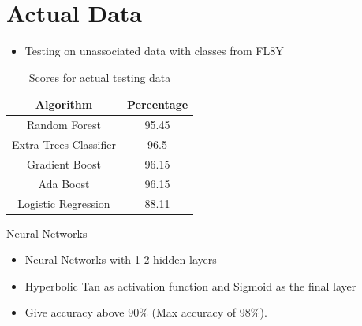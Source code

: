 \documentclass{beamer}
\begin{document}
\section{Actual Data}
\begin{frame}
\begin{itemize}
\item Testing on unassociated data with classes from FL8Y
\end{itemize}
\begin{table}[!h]
    \centering
    
    \begin{tabular}{|c|c|}
    \hline
    Algorithm&Percentage\\
     \hline
    Random Forest & 95.45\\
    \hline %
    Extra Trees Classifier& 96.5 \\
    \hline
    Gradient Boost & 96.15\\
    \hline %
    Ada Boost& 96.15 \\
    \hline %
    Logistic Regression& 88.11 \\
    \hline
     
    \end{tabular}

    \caption{Scores for actual testing data}
    \label{tab:my_label}
\end{table}{}
\end{frame}
\begin{frame}{Neural Networks}

  \begin{itemize}
  \item
    Neural Networks with 1-2 hidden layers
  \item
    Hyperbolic Tan as activation function and Sigmoid as the final layer
  \item
   Give accuracy above 90\% (Max accuracy of 98\%).
   
  \end{itemize}
  
\end{frame}
\end{document}
